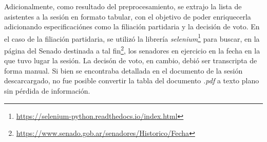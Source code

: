 \par
Adicionalmente, como resultado del preprocesamiento, se extrajo la lista de
asistentes a la sesión en formato tabular, con el objetivo de poder
enriquecerla adicionando especificaciónes como la filiación partidaria y la
decisión de voto. En el caso de la filiación partidaria, se utilizó la
librería \textit{selenium}\footnote{\url{https://selenium-python.readthedocs.io/index.html}}
para buscar, en la página del Senado destinada a tal fin\footnote{\url{https://www.senado.gob.ar/senadores/Historico/Fecha}},
los senadores en ejercicio en la fecha en la que tuvo lugar la sesión.
La decisón de voto, en cambio, debió ser transcripta de forma manual. Si bien
se encontraba detallada en el documento de la sesión descarcargado, no fue posible convertir
la tabla del documento \textit{.pdf} a texto plano sin pérdida de información.
